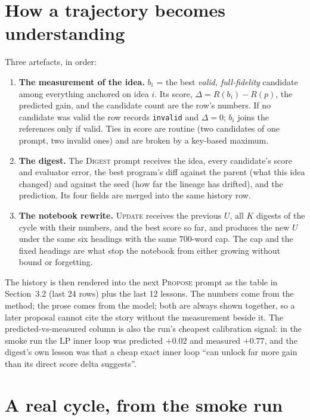 \documentclass[11pt]{article}
\newcommand{\call}[1]{\textsc{#1}}
\begin{document}
\section{How a trajectory becomes understanding}

Three artefacts, in order:

\begin{enumerate}
\item \textbf{The measurement of the idea.} $b_i$ = the best \emph{valid, full-fidelity} candidate
  among everything anchored on idea $i$. Its score, $\Delta = R(b_i) - R(p)$, the predicted gain,
  and the candidate count are the row's numbers. If no candidate was valid the row records
  \texttt{invalid} and $\Delta = 0$; $b_i$ joins the references only if valid. Ties in score
  are routine (two candidates of one prompt, two invalid ones) and are broken by a key-based
  maximum.
\item \textbf{The digest.} The \call{Digest} prompt receives the idea, every candidate's score and
  evaluator error, the best program's diff against the parent (what this idea changed) and
  against the seed (how far the lineage has drifted), and the prediction. Its four fields are
  merged into the same history row.
\item \textbf{The notebook rewrite.} \call{Update} receives the previous $U$, all $K$ digests of the
  cycle with their numbers, and the best score so far, and produces the new $U$ under the same
  six headings with the same 700-word cap. The cap and the fixed headings are what stop the
  notebook from either growing without bound or forgetting.
\end{enumerate}

\noindent The history is then rendered into the next \call{Propose} prompt as the table in
Section~3.2 (last 24 rows) plus the last 12 lessons. The numbers come from the method; the prose
comes from the model; both are always shown together, so a later proposal cannot cite the
story without the measurement beside it. The predicted-vs-measured column is also the run's
cheapest calibration signal: in the smoke run the LP inner loop was predicted $+0.02$ and
measured $+0.77$, and the digest's own lesson was that a cheap exact inner loop ``can unlock far
more gain than its direct score delta suggests''.

\section{A real cycle, from the smoke run}
\end{document}
